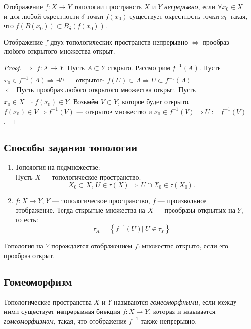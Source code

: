 \begin{definition}
    Отображение $f: X \to Y$ топологии пространств $X$ и $Y$ \textit{непрерывно}, если $\forall x_0 \in X$ и для любой окрестности $\delta$ точки $f(x_0)$ существует окрестность точки $x_0$ такая, что $f(B(x_0)) \subset B_{\delta} (f(x_0))$.
\end{definition}

\begin{statement}
    Отображение $f$ двух топологических пространств непрерывно $\Leftrightarrow$ прообраз любого открытого множества открыт.
\end{statement}
\begin{proof}
    $\underline{\Longrightarrow}$ $f: X \to Y$. Пусть $A \subset Y$ открыто. Рассмотрим $f^{-1}(A)$. Пусть $x_0 \in f^{-1}(A) \Rightarrow \exists U$ — открытое: $f(U) \subset A \Rightarrow U \subset f^{-1}(A)$. \\
    $\underline{\Longleftarrow}$ Пусть прообраз любого открытого множества открыт. Пусть $x_0 \in X \Rightarrow f(x_0) \in Y$. Возьмём $V \subset Y$, которое будет открыто. $f(x_0) \in V \Rightarrow f^{-1}(V)$ — открытое множество и $x_0 \in f^{-1}(V) \Rightarrow U := f^{-1}(V)$.
\end{proof}

\subsection{Способы задания топологии}
\begin{enumerate}
    \item Топология на подмножестве: \\
    Пусть $X$ — топологическое пространство. $$X_0 \subset X, \ U \in \tau(X) \Rightarrow \ U \cap X_0 \in \tau(X_0).$$
    \item $f: X \to Y$, $Y$ — топологическое пространство, $f$ — произвольное отображение. Тогда открытые множества на $X$ — прообразы открытых на $Y$, то есть:
    \[\tau_X = \left\{f^{-1}(U) | \ U \in \tau_Y\right\}\]
\end{enumerate}

\begin{remark}
    Топология на $Y$ порождается отображением $f$: множество открыто, если его прообраз открыт.
\end{remark}

\subsection{Гомеоморфизм}
\begin{definition}
    Топологические пространства $X$ и $Y$ называются \textit{гомеоморфными}, если между ними существует непрерывная биекция $f: X \to Y$, которая и называется \textit{гомеоморфизмом}, такая, что отображение $f^{-1}$ также непрерывно.
\end{definition}

